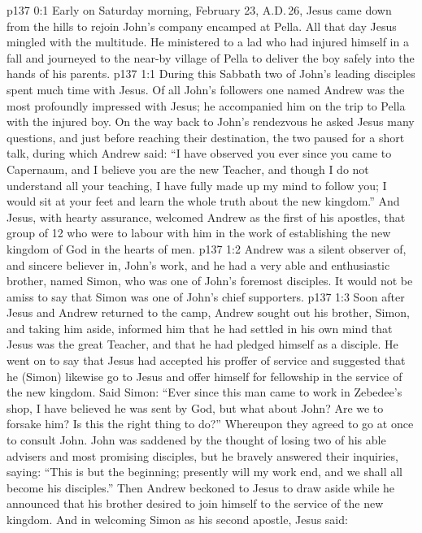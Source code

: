 \author{Midwayer Commission}
\vs p137 0:1 Early on Saturday morning, February 23, A.D.\,26, Jesus came down from the hills to rejoin John’s company encamped at Pella. All that day Jesus mingled with the multitude. He ministered to a lad who had injured himself in a fall and journeyed to the near\hyp{}by village of Pella to deliver the boy safely into the hands of his parents.
\vs p137 1:1 During this Sabbath two of John’s leading disciples spent much time with Jesus. Of all John’s followers one named Andrew was the most profoundly impressed with Jesus; he accompanied him on the trip to Pella with the injured boy. On the way back to John’s rendezvous he asked Jesus many questions, and just before reaching their destination, the two paused for a short talk, during which Andrew said: “I have observed you ever since you came to Capernaum, and I believe you are the new Teacher, and though I do not understand all your teaching, I have fully made up my mind to follow you; I would sit at your feet and learn the whole truth about the new kingdom.” And Jesus, with hearty assurance, welcomed Andrew as the first of his apostles, that group of 12 who were to labour with him in the work of establishing the new kingdom of God in the hearts of men.
\vs p137 1:2 \pc Andrew was a silent observer of, and sincere believer in, John’s work, and he had a very able and enthusiastic brother, named Simon, who was one of John’s foremost disciples. It would not be amiss to say that Simon was one of John’s chief supporters.
\vs p137 1:3 Soon after Jesus and Andrew returned to the camp, Andrew sought out his brother, Simon, and taking him aside, informed him that he had settled in his own mind that Jesus was the great Teacher, and that he had pledged himself as a disciple. He went on to say that Jesus had accepted his proffer of service and suggested that he (Simon) likewise go to Jesus and offer himself for fellowship in the service of the new kingdom. Said Simon: “Ever since this man came to work in Zebedee’s shop, I have believed he was sent by God, but what about John? Are we to forsake him? Is this the right thing to do?” Whereupon they agreed to go at once to consult John. John was saddened by the thought of losing two of his able advisers and most promising disciples, but he bravely answered their inquiries, saying: “This is but the beginning; presently will my work end, and we shall all become his disciples.” Then Andrew beckoned to Jesus to draw aside while he announced that his brother desired to join himself to the service of the new kingdom. And in welcoming Simon as his second apostle, Jesus said: 
